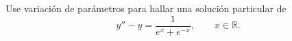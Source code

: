 Use variación de parámetros para hallar una solución particular de
\[y''-y=\frac{1}{e^x+e^{-x}},\qquad x\in\mathbb R.\]
